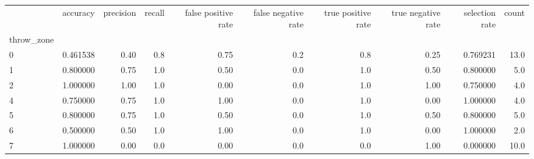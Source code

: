 \begin{tabular}{lrrrrrrrrr}
\toprule
{} &  accuracy &  precision &  recall &  false positive rate &  false negative rate &  true positive rate &  true negative rate &  selection rate &  count \\
throw\_zone &           &            &         &                      &                      &                     &                     &                 &        \\
\midrule
0          &  0.461538 &       0.40 &     0.8 &                 0.75 &                  0.2 &                 0.8 &                0.25 &        0.769231 &   13.0 \\
1          &  0.800000 &       0.75 &     1.0 &                 0.50 &                  0.0 &                 1.0 &                0.50 &        0.800000 &    5.0 \\
2          &  1.000000 &       1.00 &     1.0 &                 0.00 &                  0.0 &                 1.0 &                1.00 &        0.750000 &    4.0 \\
4          &  0.750000 &       0.75 &     1.0 &                 1.00 &                  0.0 &                 1.0 &                0.00 &        1.000000 &    4.0 \\
5          &  0.800000 &       0.75 &     1.0 &                 0.50 &                  0.0 &                 1.0 &                0.50 &        0.800000 &    5.0 \\
6          &  0.500000 &       0.50 &     1.0 &                 1.00 &                  0.0 &                 1.0 &                0.00 &        1.000000 &    2.0 \\
7          &  1.000000 &       0.00 &     0.0 &                 0.00 &                  0.0 &                 0.0 &                1.00 &        0.000000 &   10.0 \\
\bottomrule
\end{tabular}
